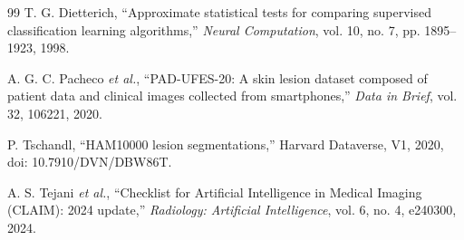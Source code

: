 \documentclass[journal]{IEEEtran}
\begin{document}
\begin{thebibliography}{99}
 T. G. Dietterich, ``Approximate statistical tests for comparing
supervised classification learning algorithms,'' \emph{Neural Computation}, vol. 10, no. 7,
pp. 1895--1923, 1998.

 A. G. C. Pacheco \emph{et al.}, ``PAD-UFES-20: A skin lesion
dataset composed of patient data and clinical images collected from smartphones,'' \emph{Data
in Brief}, vol. 32, 106221, 2020.

 P. Tschandl, ``HAM10000 lesion segmentations,'' Harvard
Dataverse, V1, 2020, doi: 10.7910/DVN/DBW86T.

 A. S. Tejani \emph{et al.}, ``Checklist for Artificial Intelligence
in Medical Imaging (CLAIM): 2024 update,'' \emph{Radiology: Artificial Intelligence}, vol. 6,
no. 4, e240300, 2024.

\end{thebibliography}
\end{document}
